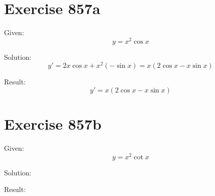 \documentclass[a4paper, 10pt]{scrartcl}
\begin{document}
\section{Exercise 857a}

Given:
\[
y = x^{2}\cos{x}
\]

Solution:
\[
y' = 2x\cos{x} + x^{2}(-\sin{x}) = x(2\cos{x} - x\sin{x})
\]

Result:
\[
y' = x(2\cos{x} - x\sin{x})
\]

\section{Exercise 857b}

Given:
\[
y = x^{2}\cot{x}
\]

Solution:

Result:
\end{document}
